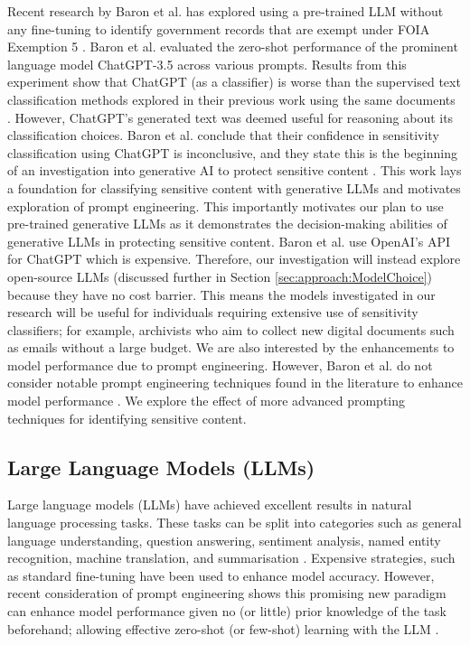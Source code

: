 Recent research by Baron et al. has explored using a pre-trained LLM without any fine-tuning to identify government records that are exempt under FOIA Exemption 5 \cite{baron2023using}. Baron et al. evaluated the zero-shot performance of the prominent language model ChatGPT-3.5 \cite{brown2020language} across various prompts. Results from this experiment show that ChatGPT (as a classifier) is worse than the supervised text classification methods explored in their previous work using the same documents \cite{baron2022providing}. However, ChatGPT’s generated text was deemed useful for reasoning about its classification choices. Baron et al. conclude that their confidence in sensitivity classification using ChatGPT is inconclusive, and they state this is the beginning of an investigation into generative AI to protect sensitive content \cite{baron2023using}. This work lays a foundation for classifying sensitive content with generative LLMs and motivates exploration of prompt engineering. This importantly motivates our plan to use pre-trained generative LLMs as it demonstrates the decision-making abilities of generative LLMs in protecting sensitive content. Baron et al. use OpenAI’s API for ChatGPT which is expensive. Therefore, our investigation will instead explore open-source LLMs (discussed further in Section \ref{sec:approach:ModelChoice}) because they have no cost barrier. This means the models investigated in our research will be useful for individuals requiring extensive use of sensitivity classifiers; for example, archivists who aim to collect new digital documents such as emails without a large budget. We are also interested by the enhancements to model performance due to prompt engineering. However, Baron et al. do not consider notable prompt engineering techniques found in the literature to enhance model performance \cite{white2023prompt}. We explore the effect of more advanced prompting techniques for identifying sensitive content.

\subsection{Large Language Models (LLMs)}
Large language models (LLMs) have achieved excellent results in natural language processing tasks. These tasks can be split into categories such as general language understanding, question answering, sentiment analysis, named entity recognition, machine translation, and summarisation \cite{qiu2020pre}. Expensive strategies, such as standard fine-tuning have been used to enhance model accuracy. However, recent consideration of prompt engineering shows this promising new paradigm can enhance model performance given no (or little) prior knowledge of the task beforehand; allowing effective zero-shot (or few-shot) learning with the LLM \cite{liu2023pre}.

